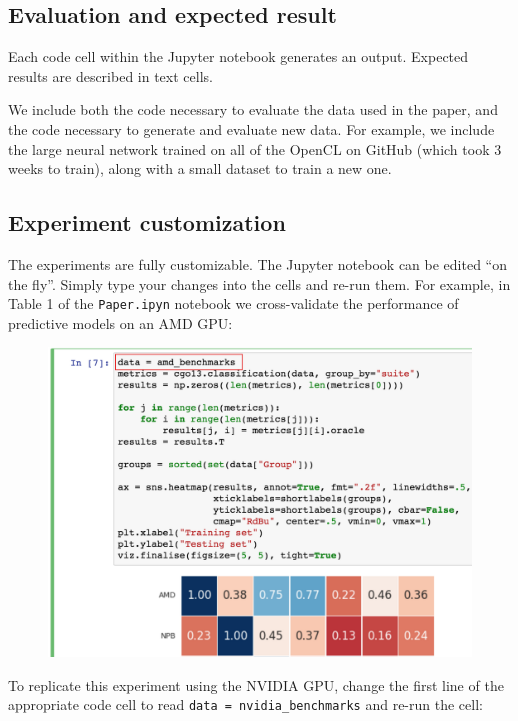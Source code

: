 \subsection{Evaluation and expected result}

Each code cell within the Jupyter notebook generates an output. Expected results are described in text cells.

We include both the code necessary to evaluate the data used in the paper, and the code necessary to generate and evaluate new data. For example, we include the large neural network trained on all of the OpenCL on GitHub (which took 3 weeks to train), along with a small dataset to train a new one.

\newpage
\subsection{Experiment customization}

The experiments are fully customizable. The Jupyter notebook can be edited ``on the fly''. Simply type your changes into the cells and re-run them. For example, in Table 1 of the \texttt{Paper.ipyn} notebook we cross-validate the performance of predictive models on an AMD GPU:

\begin{figure}[H]
  \includegraphics[width=\columnwidth]{img/example-1}
\end{figure}

\noindent
To replicate this experiment using the NVIDIA GPU, change the first line of the appropriate code cell to read \texttt{data = nvidia\_benchmarks} and re-run the cell:

